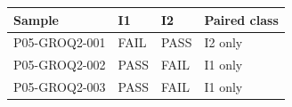 \begin{tabular}{llll}
\toprule
Sample & I1 & I2 & Paired class \\
\midrule
P05-GROQ2-001 & FAIL & PASS & I2 only \\
P05-GROQ2-002 & PASS & FAIL & I1 only \\
P05-GROQ2-003 & PASS & FAIL & I1 only \\
\bottomrule
\end{tabular}
